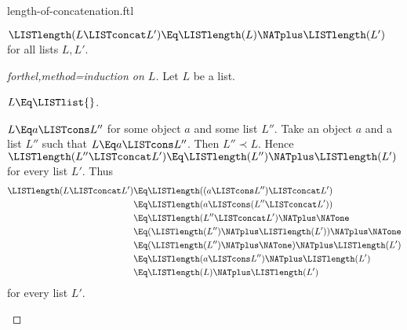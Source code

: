 \documentclass{stex}
\begin{document}
\begin{smodule}{length-of-concatenation.ftl}

\begin{proposition}[forthel,id=LISTS_LENGTHCONCAT_4512036658964875]
  $\LISTlength(L \LISTconcat L') \Eq \LISTlength(L) \NATplus \LISTlength(L')$ for all lists $L, L'$.
\end{proposition}
\begin{proof}[forthel,method=induction on $L$]
  Let $L$ be a list.

  \begin{case}{$L \Eq \LISTlist{}$.}\end{case}

  \begin{case}{$L \Eq a \LISTcons L''$ for some object $a$ and some list $L''$.}
    Take an object $a$ and a list $L''$ such that $L \Eq a \LISTcons L''$.
    Then $L'' \prec L$.
    Hence $\LISTlength(L'' \LISTconcat L') \Eq \LISTlength(L'') \NATplus \LISTlength(L')$ for every list $L'$.
    Thus
    \begin{align*}
      \LISTlength(L \LISTconcat L')
        &\Eq \LISTlength((a \LISTcons L'') \LISTconcat L')\\
        &\Eq \LISTlength(a \LISTcons (L'' \LISTconcat L'))\\
        &\Eq \LISTlength(L'' \LISTconcat L') \NATplus \NATone\\
        &\Eq (\LISTlength(L'') \NATplus \LISTlength(L')) \NATplus \NATone\\
        &\Eq (\LISTlength(L'') \NATplus \NATone) \NATplus \LISTlength(L')\\
        &\Eq \LISTlength(a \LISTcons L'') \NATplus \LISTlength(L')\\
        &\Eq \LISTlength(L) \NATplus \LISTlength(L')
    \end{align*}
    for every list $L'$.
  \end{case}
\end{proof}
\end{smodule}
\end{document}
